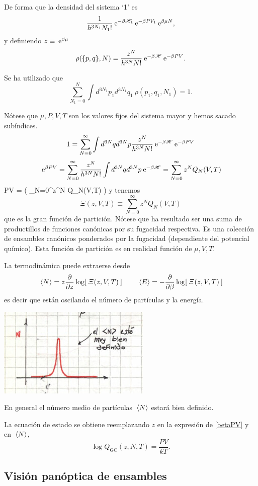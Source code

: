 \documentclass[10pt,oneside]{CBFT_book}
\begin{document}
De forma que la densidad del sistema `1' es
\[
	\frac{1}{h^{3N_1}N_1!} \:\mathrm{e}^{-\beta\mathscr{H}_1}  \:\mathrm{e}^{-\beta PV_1}  \:\mathrm{e}^{\beta \mu N},
\]
y definiendo $z \equiv \:\mathrm{e}^{\beta\mu}$
\[
	\rho(\{p,q\},N) = \frac{z^N}{h^{3N}N!} \:\mathrm{e}^{-\beta\mathscr{H}}  \:\mathrm{e}^{-\beta PV}. 
\]

Se ha utilizado que
\[
	\sum_{N_1=0}^N \int d^{3N_1}p_1  d^{3N_1}q_1 \: \rho(p_1,q_1,N_1) = 1.
\]


Nótese que $ \mu, P, V, T$  son los valores fijos del sistema mayor y hemos sacado subíndices.
\[
	1 = \sum_{N=0}^\infty \int d^{3N}q d^{3N}p \frac{z^N}{h^{3N}N!} \:\mathrm{e}^{-\beta\mathscr{H}}  \:\mathrm{e}^{-\beta PV} 
\]
\[
	\:\mathrm{e}^{\beta PV} = \sum_{N=0}^\infty \frac{z^N}{h^{3N}N!} \int d^{3N}q d^{3N}p \:\mathrm{e}^{-\beta\mathscr{H}}
	= \sum_{N=0}^\infty z^N Q_N(V,T)
\]
\be
	\beta PV = \log \left( \sum_{N=0}^\infty z^N Q_N(V,T) \right)
	\label{betaPV}
\ee
y tenemos 
\[
	\Xi(z,V,T) \equiv \sum_{N=0}^\infty z^N Q_N(V,T)
\]
que es la gran función de partición. Nótese que ha resultado ser una suma de productillos de
funciones canónicas por su fugacidad respectiva.
Es una colección de ensambles canónicos ponderados por la fugacidad (dependiente del potencial químico).
Esta función de partición es en realidad función de $\mu,V,T$.

La termodinámica puede extraerse desde 
\[
	\:\left\langle N \right\rangle = z\frac{\partial^{\hspace{-0.05em}} {}}{\partial {z}^{\hspace{-0.05em}}} \log [ \:\Xi(z,V,T) \:]     \qquad 
	\:\left\langle E \right\rangle = -\frac{\partial^{\hspace{-0.05em}} {}}{\partial {\beta}^{\hspace{-0.05em}}} \log [ \:\Xi(z,V,T)\: ]
\]
es decir que están oscilando el número de partículas y la energía.

\includegraphics[scale=0.5]{images/1606329436.jpg} 

En general el número medio de partículas $\:\left\langle N \right\rangle$ estará bien definido.

La ecuación de estado se obtiene reemplazando $z$ en la expresión de \eqref{betaPV} y en $\:\left\langle N \right\rangle$,
\[
	\log Q_\text{GC}(z,N,T) = \frac{PV}{kT}.
\]


\subsection{Visión panóptica de ensambles}
\end{document}
